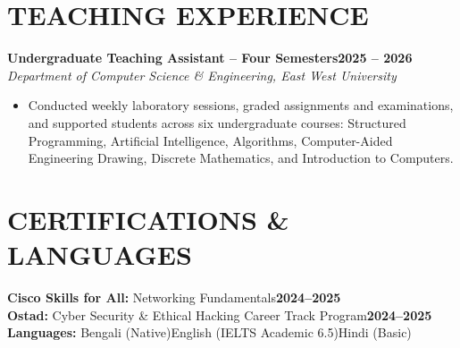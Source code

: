 \documentclass[10pt,a4paper]{article}
\begin{document}
\section*{TEACHING EXPERIENCE}
\textbf{Undergraduate Teaching Assistant -- Four Semesters}\hfill\textbf{2025 -- 2026}\\[-1pt]
\textit{Department of Computer Science \& Engineering, East West University}
\begin{itemize}
    \item Conducted weekly laboratory sessions, graded assignments and examinations, and supported students across six undergraduate courses: Structured Programming, Artificial Intelligence, Algorithms, Computer-Aided Engineering Drawing, Discrete Mathematics, and Introduction to Computers.
\end{itemize}

\section*{CERTIFICATIONS \& LANGUAGES}
\textbf{Cisco Skills for All:} Networking Fundamentals\hfill\textbf{2024--2025}\\[-1pt]
\textbf{Ostad:} Cyber Security \& Ethical Hacking Career Track Program\hfill\textbf{2024--2025}\\[-1pt]
\textbf{Languages:} Bengali (Native)\quad English (IELTS Academic 6.5)\quad Hindi (Basic)
\end{document}
